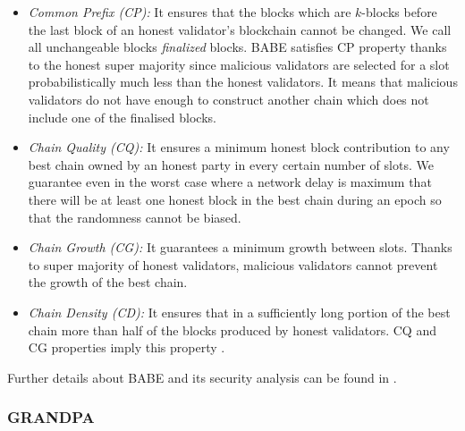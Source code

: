 \documentclass{article}
\begin{document}
\begin{itemize}
	\item \emph{Common Prefix (CP):} \label{item:common_prefix}
	It ensures that the blocks which are $ k $-blocks before the last block of an honest validator's blockchain cannot be changed. We call  all unchangeable blocks  \emph{finalized} blocks. BABE satisfies CP property thanks to the honest super majority since malicious validators are selected for a slot probabilistically much less than the honest validators. It means that malicious validators do
	not have enough 
	to construct another chain which does not include one of the finalised blocks.
	\item \emph{Chain Quality (CQ):} \label{item:chain_quality} It ensures a minimum honest block contribution to any best chain owned by an honest party in every certain number of slots. We guarantee even in the worst case where a network delay is maximum that there will be at least one honest block in the best chain during an epoch so that the randomness cannot be biased.
	\item \emph{Chain Growth (CG):} \label{item:chain_growth} It guarantees a minimum growth between slots. Thanks to super majority of honest validators, malicious validators cannot prevent the growth of the best chain.
	
	\item \emph{Chain Density (CD):} \label{item:chain_density} It ensures that in a sufficiently long portion of the best chain more than half of the blocks produced by honest validators. CQ and CG properties %
	imply this property \cite{Praos}.
\end{itemize}
Further details about BABE and  its security analysis can be found in \cite{babe}.




\subsubsection{GRANDPA} \label{sec:grandpa}
\end{document}
